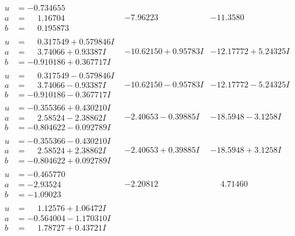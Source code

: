 \documentclass[1p]{elsarticle_modified}
\theoremstyle{definition}
\begin{document}
$$\begin{array}{c|c|c}
\begin{aligned}
u &= -0.734655\phantom{ +0.000000I} \\
a &= \phantom{-}1.16704\phantom{ +0.000000I} \\
b &= \phantom{-}0.195873\phantom{ +0.000000I}\end{aligned}
 & -7.96223\phantom{ +0.000000I} & -11.3580\phantom{ +0.000000I} \\ \hline\begin{aligned}
u &= \phantom{-}0.317549 + 0.579846 I \\
a &= \phantom{-}3.74066 + 0.93387 I \\
b &= -0.910186 + 0.367717 I\end{aligned}
 & -10.62150 + 0.95783 I & -12.17772 + 5.24325 I \\ \hline\begin{aligned}
u &= \phantom{-}0.317549 - 0.579846 I \\
a &= \phantom{-}3.74066 - 0.93387 I \\
b &= -0.910186 - 0.367717 I\end{aligned}
 & -10.62150 - 0.95783 I & -12.17772 - 5.24325 I \\ \hline\begin{aligned}
u &= -0.355366 + 0.430210 I \\
a &= \phantom{-}2.58524 - 2.38862 I \\
b &= -0.804622 - 0.092789 I\end{aligned}
 & -2.40653 - 0.39885 I & -18.5948 - 3.1258 I \\ \hline\begin{aligned}
u &= -0.355366 - 0.430210 I \\
a &= \phantom{-}2.58524 + 2.38862 I \\
b &= -0.804622 + 0.092789 I\end{aligned}
 & -2.40653 + 0.39885 I & -18.5948 + 3.1258 I \\ \hline\begin{aligned}
u &= -0.465770\phantom{ +0.000000I} \\
a &= -2.93524\phantom{ +0.000000I} \\
b &= -1.09023\phantom{ +0.000000I}\end{aligned}
 & -2.20812\phantom{ +0.000000I} & \phantom{-}4.71460\phantom{ +0.000000I} \\ \hline\begin{aligned}
u &= \phantom{-}1.12576 + 1.06472 I \\
a &= -0.564004 - 1.170310 I \\
b &= \phantom{-}1.78727 + 0.43721 I\end{aligned}

\end{array}$$
\end{document}
